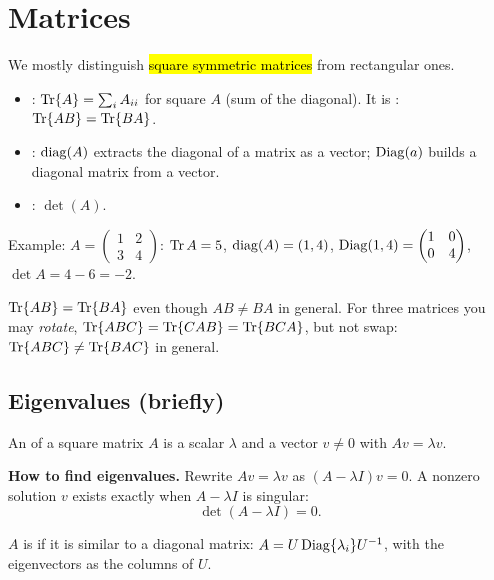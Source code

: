 \section{Matrices}

We mostly distinguish \hl{square symmetric matrices} from rectangular ones.

\begin{defn}
\begin{itemize}
  \item {}: $\operatorname{Tr}\{A\} = \sum_iA_{ii}$ for square $A$ (sum of the diagonal). It is : $\operatorname{Tr}\{AB\} = \operatorname{Tr}\{BA\}$.
  \item {}: $\operatorname{diag}(A)$ extracts the diagonal of a matrix as a vector; $\operatorname{Diag}(a)$ builds a diagonal matrix from a vector.
  \item {}: $\det(A)$.
\end{itemize}
Example: $A=\begin{pmatrix}1&2\\3&4\end{pmatrix}$: $\operatorname{Tr} A=5$, $\operatorname{diag}(A)=(1,4)$, $\operatorname{Diag}(1,4)=\begin{pmatrix}1&0\\0&4\end{pmatrix}$, $\det A = 4-6=-2$.
\end{defn}

\begin{pitfall}
$\operatorname{Tr}\{AB\}=\operatorname{Tr}\{BA\}$ even though $AB\neq BA$ in general. For three matrices you may \emph{rotate}, $\operatorname{Tr}\{ABC\}=\operatorname{Tr}\{CAB\}=\operatorname{Tr}\{BCA\}$,
but not swap: $\operatorname{Tr}\{ABC\}\neq\operatorname{Tr}\{BAC\}$ in general.
\end{pitfall}

\subsection{Eigenvalues (briefly)}

\begin{defn}[Eigenpair]
An  of a square matrix $A$ is a scalar $\lambda$ and a vector $v\ne0$ with $Av=\lambda v$.
\end{defn}

\textbf{How to find eigenvalues.} Rewrite $Av=\lambda v$ as $(A-\lambda I)v=0$. A nonzero solution $v$ exists exactly when
$A-\lambda I$ is singular:
\[ \det(A-\lambda I)=0. \]

\begin{defn}[Diagonalizable]
$A$ is  if it is similar to a diagonal matrix: $A = U\operatorname{Diag}\{\lambda_i\}U^{-1}$, with the eigenvectors as the columns of $U$.
\end{defn}

